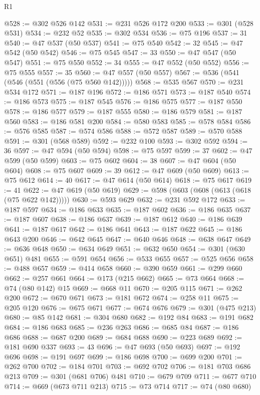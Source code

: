 \begin{lexlean}{R1}
\begin{coremodule}
@528 := @302 @526 @142
@531 := @231 @526 @172 @200
@533 := @301 (@528 @531)
@534 := @232 @52
@535 := @302 @534
@536 := @75 @196
@537 := 31
@540 := @47 @537 (@50 @537)
@541 := @75 @540
@542 := 32
@545 := @47 @542 (@50 @542)
@546 := @75 @545
@547 := 33
@550 := @47 @547 (@50 @547)
@551 := @75 @550
@552 := 34
@555 := @47 @552 (@50 @552)
@556 := @75 @555
@557 := 35
@560 := @47 @557 (@50 @557)
@567 := @536 (@541 (@546 (@551 (@556 (@75 @560 @142)))))
@568 := @535 @567
@570 := @231 @534 @172
@571 := @187 @196
@572 := @186 @571
@573 := @187 @540
@574 := @186 @573
@575 := @187 @545
@576 := @186 @575
@577 := @187 @550
@578 := @186 @577
@579 := @187 @555
@580 := @186 @579
@581 := @187 @560
@583 := @186 @581 @200
@584 := @580 @583
@585 := @578 @584
@586 := @576 @585
@587 := @574 @586
@588 := @572 @587
@589 := @570 @588
@591 := @301 (@568 @589)
@592 := @232 @100
@593 := @302 @592
@594 := 36
@597 := @47 @594 (@50 @594)
@598 := @75 @597
@599 := 37
@602 := @47 @599 (@50 @599)
@603 := @75 @602
@604 := 38
@607 := @47 @604 (@50 @604)
@608 := @75 @607
@609 := 39
@612 := @47 @609 (@50 @609)
@613 := @75 @612
@614 := 40
@617 := @47 @614 (@50 @614)
@618 := @75 @617
@619 := 41
@622 := @47 @619 (@50 @619)
@629 := @598 (@603 (@608 (@613 (@618 (@75 @622 @142)))))
@630 := @593 @629
@632 := @231 @592 @172
@633 := @187 @597
@634 := @186 @633
@635 := @187 @602
@636 := @186 @635
@637 := @187 @607
@638 := @186 @637
@639 := @187 @612
@640 := @186 @639
@641 := @187 @617
@642 := @186 @641
@643 := @187 @622
@645 := @186 @643 @200
@646 := @642 @645
@647 := @640 @646
@648 := @638 @647
@649 := @636 @648
@650 := @634 @649
@651 := @632 @650
@654 := @301 (@630 @651) @481
@655 := @591 @654
@656 := @533 @655
@657 := @525 @656
@658 := @488 @657
@659 := @414 @658
@660 := @390 @659
@661 := @299 @660
@662 := @257 @661
@664 := @173 (@215 @662)
@665 := @73 @664
@668 := @74 (@80 @142) @15
@669 := @668 @11
@670 := @205 @115
@671 := @262 @200
@672 := @670 @671
@673 := @181 @672
@674 := @258 @11
@675 := @205 @120
@676 := @675 @671
@677 := @674 @676
@679 := @301 (@475 @213)
@680 := @85 @142
@681 := @304 @680
@682 := @192 @84
@683 := @191 @682
@684 := @186 @683
@685 := @236 @263
@686 := @685 @84
@687 := @186 @686
@688 := @687 @200
@689 := @684 @688
@690 := @223 @689
@692 := @181 @690 @337
@693 := 43
@696 := @47 @693 (@50 @693)
@697 := @192 @696
@698 := @191 @697
@699 := @186 @698
@700 := @699 @200
@701 := @262 @700
@702 := @184 @701
@703 := @692 @702
@706 := @181 @703 @686 @213
@709 := @301 (@681 @706) @481
@710 := @679 @709
@711 := @677 @710
@714 := @669 (@673 @711 @213)
@715 := @73 @714
@717 := @74 (@80 @680)

\end{coremodule}
\end{lexlean}
